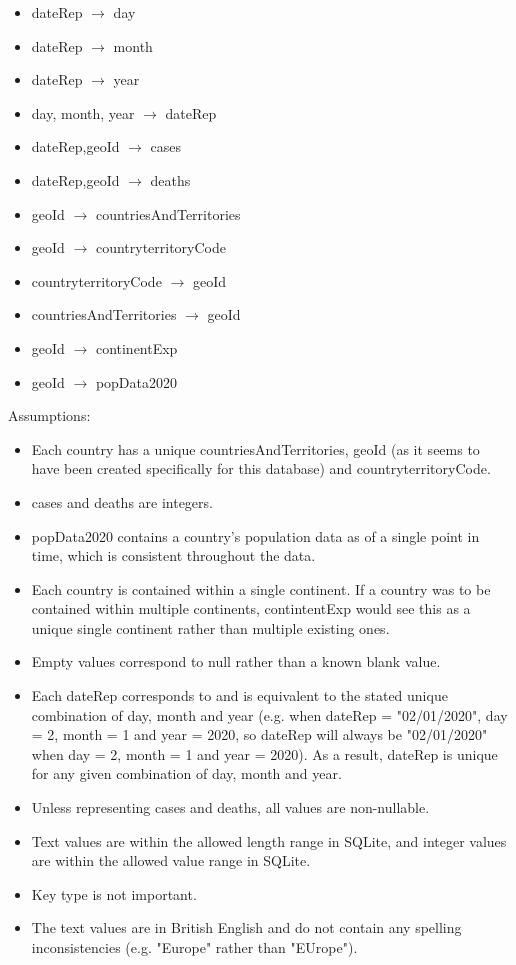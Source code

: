 \documentclass{article}
\begin{document}
\begin{itemize}
\item dateRep $\rightarrow$ day
\item dateRep $\rightarrow$ month
\item dateRep $\rightarrow$ year
\item day, month, year $\rightarrow$ dateRep
\item dateRep,geoId $\rightarrow$ cases
\item dateRep,geoId $\rightarrow$ deaths
\item geoId $\rightarrow$ countriesAndTerritories
\item geoId $\rightarrow$ countryterritoryCode
\item countryterritoryCode $\rightarrow$ geoId
\item countriesAndTerritories $\rightarrow$ geoId
\item geoId $\rightarrow$ continentExp
\item geoId $\rightarrow$ popData2020
\end{itemize}

Assumptions:
\begin{itemize}
\item Each country has a unique countriesAndTerritories, geoId (as it seems to have been created specifically for this database) and countryterritoryCode.
\item cases and deaths are integers.
\item popData2020 contains a country's population data as of a single point in time, which is consistent throughout the data.
\item Each country is contained within a single continent. If a country was to be contained within multiple continents, contintentExp would see this as a unique single continent rather than multiple existing ones.
\item Empty values correspond to null rather than a known blank value.
\item Each dateRep corresponds to and is equivalent to the stated unique combination of day, month and year (e.g. when dateRep = "02/01/2020", day = 2, month = 1 and year = 2020, so dateRep will always be "02/01/2020" when day = 2, month = 1 and year = 2020). As a result, dateRep is unique for any given combination of day, month and year.
\item Unless representing cases and deaths, all values are non-nullable.
\item Text values are within the allowed length range in SQLite, and integer values are within the allowed value range in SQLite.
\item Key type is not important.
\item The text values are in British English and do not contain any spelling inconsistencies (e.g. "Europe" rather than "EUrope").
\end{itemize}
\end{document}
